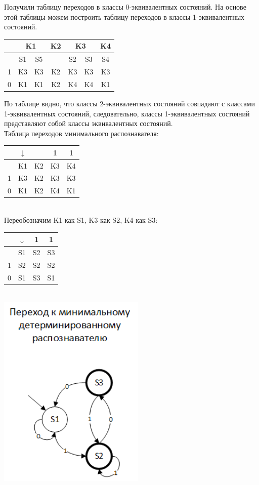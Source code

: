 \documentclass[a4paper,14pt]{extarticle}
\begin{document}
\begin{enumerate}[1.]
Получили таблицу переходов в классы 0-эквивалентных состояний. На основе 
этой таблицы можем построить таблицу переходов в классы 1-эквивалентных 
состояний. 

\begin{tabular}{|c|c|c|c|c|c|c|}
    \hline
    & \multicolumn{2}{c|}{K1} & K2 & \multicolumn{2}{c|}{K3} & K4 \\
    \hline
      & S1 & S5 &    & S2 & S3 & S4 \\
    \hline
    1 & K3 & K3 & K2 & K3 & K3 & K3 \\
    \hline
    0 & K1 & K1 & K2 & K4 & K4 & K1 \\
    \hline
\end{tabular}

По таблице видно, что классы 2-эквивалентных состояний совпадают с
классами 1-эквивалентных состояний, следовательно, классы 1-эквивалентных 
состояний представляют собой классы эквивалентных состояний.\\

Таблица переходов минимального распознавателя:\\
\begin{tabular}{|c|c|c|c|c|}
\hline
  & $\downarrow$ & & 1 & 1 \\
\hline
  & K1 & K2 & K3 & K4\\
\hline
1 & K3 & K2 & K3 & K3\\
\hline
0 & K1 & K2 & K4 & K1\\
\hline

\end{tabular}\\

Переобозначим K1 как S1, K3 как S2, K4 как S3:\\

\begin{tabular}{|c|c|c|c|}
\hline
    & $\downarrow$ & 1 & 1 \\
\hline
  & S1 & S2 & S3\\
\hline
1 & S2 & S2 & S2\\
\hline
0 & S1 & S3 & S1\\
\hline

\end{tabular}\\
\includegraphics[width=70mm]{task3_new_determined_minimal}


\end{enumerate}
\end{document}
